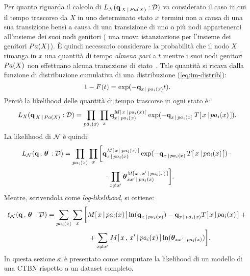 Per quanto riguarda il calcolo di $L_{\mathnormal{X}}(\boldsymbol{\textbf{\text{q}}}_{\,\mathnormal{X}\,\arrowvert\,Pa(\mathnormal{X})}:\mathcal{D})$ va considerato il caso in cui il tempo trascorso da $X$ in uno determinato stato $\mathnormal{x}$ termini non a causa di una sua transizione bensì a causa di una transizione di uno o più nodi appartenenti all'insieme dei suoi nodi genitori (\ie{} una nuova istanziazione per l'insieme dei genitori $Pa(\mathnormal{X})$). \`E quindi necessario considerare la probabilità che il nodo $X$ rimanga in $x$ una quantità di tempo \emph{almeno pari} a $t$ mentre i suoi nodi genitori $Pa(\mathnormal{X})$ non effettuano alcuna transizione di stato~\citep[si veda][3]{Nodelman2002}. Tale quantità si ricava dalla funzione di distribuzione cumulativa di una distribuzione  (\autoref{eq:im-distrib}):
\[
1-F(t)=\exp(-\boldsymbol{\textbf{\text{q}}}_{\mathnormal{x}\,\arrowvert\,pa_i(\mathnormal{x})} t)\text{.}
\]
Perciò la likelihood delle quantità di tempo trascorse in ogni stato è:
\small
\[
L_{\setel{X}}(\param{q}_{\,\setel{X}\,\arrowvert\,Pa(\setel{X})}:\conceptsym{D})=\prod_{pa_i(\setel{x})}\prod_{x}\param{q}_{x\,\arrowvert\,pa_i(\setel{x})}^{\mstat{x\,\arrowvert\,pa_i(\setel{x})}}\exp(-\param{q}_{\setel{x}\,\arrowvert\,pa_i(\setel{x})}\,\tstat{\setel{x}\,\arrowvert\,pa_i(\setel{x})})\text{\normalsize .}
\]
\normalsize
La likelihood di $\mathcal{N}$ è quindi:
\footnotesize
\begin{align}\label{eq:ctbn-likelihood}
L_{\conceptsym{N}}(\param{q}\,,\,\param{$\theta$}\,:\conceptsym{D}) &= \prod_{pa_i(\setel{x})}\prod_{\setel{x}} \bigg[ \param{q}_{\setel{x}\,\arrowvert\,pa_i(\setel{x})}^{\mstat{x\,\arrowvert\,pa_i(\setel{x})}}\exp(-\param{q}_{\setel{x}\,\arrowvert\,pa_i(\setel{x})}\,\tstat{x\,\arrowvert\,pa_i(\setel{x})}) \cdot \bigg.\nonumber\\
& \qquad \bigg.{} \qquad \qquad \cdot \prod_{\setel{x}\neq \setel{x}^{\prime}}\param{$\theta$}_{\setel{x}\setel{x}^{\prime}\,\arrowvert\,pa_i(\setel{x})}^{\mstat[x]{\setel{x}^{\prime}\,\arrowvert\,pa_i(\setel{x})}} \bigg] \text{\normalsize .}
\end{align}
\normalsize
Mentre, scrivendola come \emph{log-likelihood}, si ottiene:
\footnotesize
\begin{align}\label{eq:ctbn-log-likelihood}
\ell_{\conceptsym{N}}(\param{q}\,,\,\param{$\theta$}\,:\conceptsym{D}) &= \sum_{pa_i(\setel{x})}\sum_{\setel{x}} \bigg[ \mstat{x\,\arrowvert\,pa_i(\setel{x})}\ln(\param{q}_{x\,\arrowvert\,pa_i(\setel{x})})- \param{q}_{\setel{x}\,\arrowvert\,pa_i(\setel{x})}\tstat{\setel{x}\,\arrowvert\,pa_i(\setel{x})} + \bigg.\nonumber\\
& \qquad \bigg.{} \qquad \qquad + \sum_{\setel{x}\neq \setel{x}^{\prime}}\mstat[x]{\setel{x}^{\prime}\,\arrowvert\,pa_i(\setel{x})}\ln(\param{$\theta$}_{\setel{x}\setel{x}^{\prime}\,\arrowvert\,pa_i(\setel{x})}) \bigg] \text{\normalsize .}
\end{align}
\normalsize
In questa sezione si è presentato come computare la likelihood di un modello di una \acs{CTBN} rispetto a un dataset completo.

